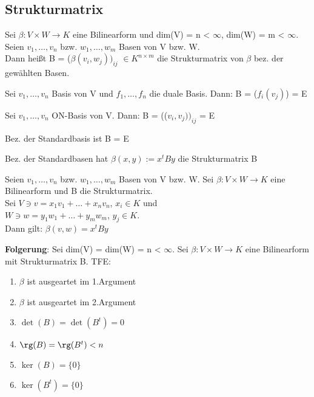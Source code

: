 \subsection{Strukturmatrix}
\begin{definition}
Sei $\beta: V \times W \to K$ eine Bilinearform und dim(V) = n < $\infty$, dim(W) = m < $\infty$. Seien $v_1, …, v_n$ bzw. $w_1, …, w_m$ Basen von V bzw. W.\\
Dann heißt B = ($\beta(v_i, w_j))_{ij}$ $\in K^{n \times m}$ die Strukturmatrix von $\beta$ bez. der gewählten Basen.
\end{definition}

\begin{example}
\leavevmode
\begin{compactitem}
\item Sei $v_1, …, v_n$ Basis von V und $f_1, …, f_n$ die duale Basis. Dann: B = ($f_i(v_j)$) = E
\item Sei $v_1, …, v_n$ ON-Basis von V. Dann: B = (($v_i, v_j))_{ij}$ = E
\item Bez. der Standardbasis ist B = E
\item Bez. der Standardbasen hat $\beta(x,y) := x^tBy$ die Strukturmatrix B
\end{compactitem}
\end{example}

\begin{theorem}
Seien $v_1, …, v_n$ bzw. $w_1, …, w_m$ Basen von V bzw. W. Sei $\beta: V \times W \to K$ eine Bilinearform und B die Strukturmatrix.\\
Sei $V \ni v = x_1v_1 + … + x_nv_n$, $x_i \in K$ und\\
\hspace*{4mm} $W \ni w = y_1w_1 + … + y_mw_m$, $y_j \in K$.\\
Dann gilt: $\beta(v, w) = x^tBy$

\textbf{Folgerung}:
Sei dim(V) = dim(W) = n < $\infty$. Sei $\beta: V \times W \to K$ eine Bilinearform mit Strukturmatrix B. TFE:
\begin{enumerate}
\item $\beta$ ist ausgeartet im 1.Argument
\item $\beta$ ist ausgeartet im 2.Argument
\item $\det(B) = \det(B^t) = 0$
\item $\rg(B) = \rg(B^t) < n$
\item $\ker(B) = \{0\}$
\item $\ker(B^t) = \{0\}$
\end{enumerate}
\end{theorem}
